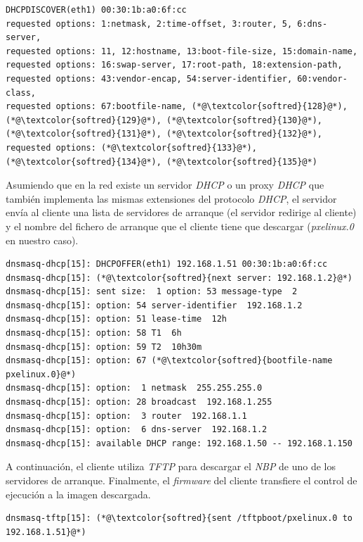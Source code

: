 \documentclass[a4paper,12pt,spanish,final]{epsc_tfc_pfc}
\begin{document}
\begin{lstlisting}[style=dnsmasq]
DHCPDISCOVER(eth1) 00:30:1b:a0:6f:cc
requested options: 1:netmask, 2:time-offset, 3:router, 5, 6:dns-server,
requested options: 11, 12:hostname, 13:boot-file-size, 15:domain-name,
requested options: 16:swap-server, 17:root-path, 18:extension-path,
requested options: 43:vendor-encap, 54:server-identifier, 60:vendor-class,
requested options: 67:bootfile-name, (*@\textcolor{softred}{128}@*), (*@\textcolor{softred}{129}@*), (*@\textcolor{softred}{130}@*), (*@\textcolor{softred}{131}@*), (*@\textcolor{softred}{132}@*),
requested options: (*@\textcolor{softred}{133}@*), (*@\textcolor{softred}{134}@*), (*@\textcolor{softred}{135}@*)
\end{lstlisting}

Asumiendo que en la red existe un servidor \emph{DHCP} o un proxy \emph{DHCP} que también implementa las mismas extensiones del protocolo \emph{DHCP}, el servidor envía al cliente una lista de servidores de arranque (el servidor redirige al cliente) y el nombre del fichero de arranque que el cliente tiene que descargar (\emph{pxelinux.0} en nuestro caso).\\

\begin{lstlisting}[style=dnsmasq]
dnsmasq-dhcp[15]: DHCPOFFER(eth1) 192.168.1.51 00:30:1b:a0:6f:cc
dnsmasq-dhcp[15]: (*@\textcolor{softred}{next server: 192.168.1.2}@*)
dnsmasq-dhcp[15]: sent size:  1 option: 53 message-type  2
dnsmasq-dhcp[15]: option: 54 server-identifier  192.168.1.2
dnsmasq-dhcp[15]: option: 51 lease-time  12h
dnsmasq-dhcp[15]: option: 58 T1  6h
dnsmasq-dhcp[15]: option: 59 T2  10h30m
dnsmasq-dhcp[15]: option: 67 (*@\textcolor{softred}{bootfile-name  pxelinux.0}@*)
dnsmasq-dhcp[15]: option:  1 netmask  255.255.255.0
dnsmasq-dhcp[15]: option: 28 broadcast  192.168.1.255
dnsmasq-dhcp[15]: option:  3 router  192.168.1.1
dnsmasq-dhcp[15]: option:  6 dns-server  192.168.1.2
dnsmasq-dhcp[15]: available DHCP range: 192.168.1.50 -- 192.168.1.150
\end{lstlisting}

A continuación, el cliente utiliza \emph{TFTP} para descargar el \emph{NBP} de uno de los servidores de arranque. Finalmente, el \emph{firmware} del cliente transfiere el control de ejecución a la imagen descargada.\\

\begin{lstlisting}[style=dnsmasq]
dnsmasq-tftp[15]: (*@\textcolor{softred}{sent /tftpboot/pxelinux.0 to 192.168.1.51}@*)
\end{lstlisting}
\end{document}
